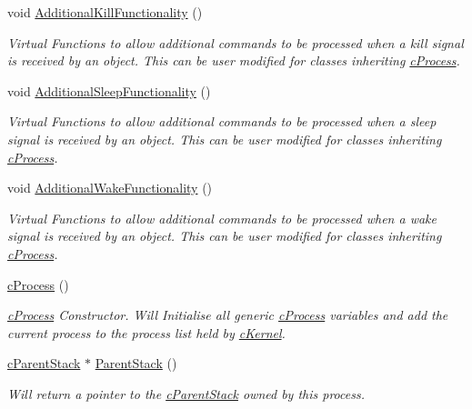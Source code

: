 \begin{DoxyCompactItemize}
void \hyperlink{classc_process_a36360c0e5cce8170540623f1ddf52f99}{AdditionalKillFunctionality} ()
\begin{DoxyCompactList}\small\item\em Virtual Functions to allow additional commands to be processed when a kill signal is received by an object. This can be user modified for classes inheriting \hyperlink{classc_process}{cProcess}. \item\end{DoxyCompactList}\item 
void \hyperlink{classc_process_a2574289ef0d498ec61a9b7ad9b0fd0c5}{AdditionalSleepFunctionality} ()
\begin{DoxyCompactList}\small\item\em Virtual Functions to allow additional commands to be processed when a sleep signal is received by an object. This can be user modified for classes inheriting \hyperlink{classc_process}{cProcess}. \item\end{DoxyCompactList}\item 
void \hyperlink{classc_process_a15b63d6b6a07fff977d8915a84e68ebf}{AdditionalWakeFunctionality} ()
\begin{DoxyCompactList}\small\item\em Virtual Functions to allow additional commands to be processed when a wake signal is received by an object. This can be user modified for classes inheriting \hyperlink{classc_process}{cProcess}. \item\end{DoxyCompactList}\item 
\hyperlink{classc_process_aacef3df3ad7e22197c4360c4b791f2e1}{cProcess} ()
\begin{DoxyCompactList}\small\item\em \hyperlink{classc_process}{cProcess} Constructor. Will Initialise all generic \hyperlink{classc_process}{cProcess} variables and add the current process to the process list held by \hyperlink{classc_kernel}{cKernel}. \item\end{DoxyCompactList}\item 
\hyperlink{classc_parent_stack}{cParentStack} $\ast$ \hyperlink{classc_process_a4d7c47103e70de9679c1260bb0269bf1}{ParentStack} ()
\begin{DoxyCompactList}\small\item\em Will return a pointer to the \hyperlink{classc_parent_stack}{cParentStack} owned by this process. \item\end{DoxyCompactList}\end{DoxyCompactItemize}
